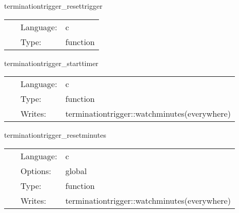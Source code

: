 
\hspace{5mm} terminationtrigger\_resettrigger 

\hspace{5mm}{\it clear trigger state } 


\hspace{5mm}

 \begin{tabular*}{160mm}{cll} 
~ & Language:  & c \\ 
~ & Type:  & function \\ 
\end{tabular*} 


\vspace{5mm}


\hspace{5mm} terminationtrigger\_starttimer 

\hspace{5mm}{\it start timer } 


\hspace{5mm}

 \begin{tabular*}{160mm}{cll} 
~ & Language:  & c \\ 
~ & Type:  & function \\ 
~ & Writes:  & terminationtrigger::watchminutes(everywhere) \\ 
\end{tabular*} 


\vspace{5mm}


\hspace{5mm} terminationtrigger\_resetminutes 

\hspace{5mm}{\it reset watchtime } 


\hspace{5mm}

 \begin{tabular*}{160mm}{cll} 
~ & Language:  & c \\ 
~ & Options:  & global \\ 
~ & Type:  & function \\ 
~ & Writes:  & terminationtrigger::watchminutes(everywhere) \\ 
\end{tabular*} 


